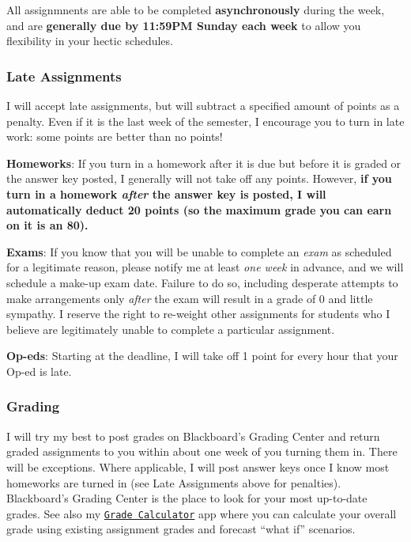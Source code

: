 \documentclass{article}
\begin{document}
All assignmnents are able to be completed \textbf{asynchronously} during
the week, and are \textbf{generally due by 11:59PM Sunday each week} to
allow you flexibility in your hectic schedules.

\hypertarget{late-assignments}{%
\subsubsection*{Late Assignments}\label{late-assignments}}

I will accept late assignments, but will subtract a specified amount of
points as a penalty. Even if it is the last week of the semester, I
encourage you to turn in late work: some points are better than no
points!

\textbf{Homeworks}: If you turn in a homework after it is due but before
it is graded or the answer key posted, I generally will not take off any
points. However, \textbf{if you turn in a homework \emph{after} the
answer key is posted, I will automatically deduct 20 points (so the
maximum grade you can earn on it is an 80).}

\textbf{Exams}: If you know that you will be unable to complete an
\emph{exam} as scheduled for a legitimate reason, please notify me at
least \emph{one week} in advance, and we will schedule a make-up exam
date. Failure to do so, including desperate attempts to make
arrangements only \emph{after} the exam will result in a grade of 0 and
little sympathy. I reserve the right to re-weight other assignments for
students who I believe are legitimately unable to complete a particular
assignment.

\textbf{Op-eds}: Starting at the deadline, I will take off 1 point for
every hour that your Op-ed is late.

\hypertarget{grading}{%
\subsubsection*{Grading}\label{grading}}

I will try my best to post grades on Blackboard's Grading Center and
return graded assignments to you within about one week of you turning
them in. There will be exceptions. Where applicable, I will post answer
keys once I know most homeworks are turned in (see Late Assignments
above for penalties). Blackboard's Grading Center is the place to look
for your most up-to-date grades. See also my
\href{https://ryansafner.shinyapps.io/306_grade_calculator/}{
\texttt{Grade\ Calculator}} app where you can calculate your overall
grade using existing assignment grades and forecast ``what if''
scenarios.
\end{document}
